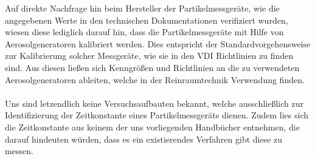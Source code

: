 Auf direkte Nachfrage hin beim Hersteller der Partikelmessger\"{a}te, wie die angegebenen Werte in den technischen Dokumentationen verifiziert wurden, wiesen diese lediglich darauf hin, dass die Partikelmessger\"{a}te mit Hilfe von Aerosolgeneratoren kalibriert werden. Dies entspricht der Standardvorgehensweise zur Kalibrierung solcher Messger\"{a}te, wie sie in den VDI Richtlinien zu finden sind. Aus diesen lie{\ss}en sich Kenngr\"{o}{\ss}en und Richtlinien an die zu verwendeten Aerosolgeneratoren ableiten, welche in der Reinraumtechnik Verwendung finden.
\\\\
Uns sind letzendlich keine Versuchsaufbauten bekannt, welche ausschlie{\ss}lich zur Identifizierung der Zeitkonstante eines Partikelmessger\"{a}ts dienen. Zudem lies sich die Zeitkonstante aus keinem der uns vorliegenden Handb\"{u}cher entnehmen, die darauf hindeuten w\"{u}rden, dass es ein existierendes Verfahren gibt diese zu messen. 